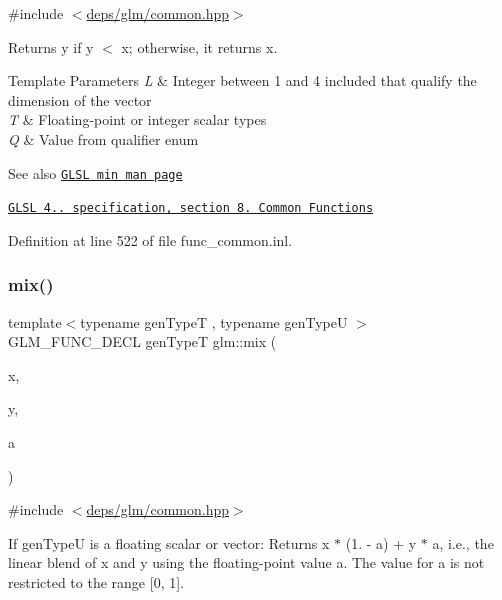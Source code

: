 {\ttfamily \#include $<$\hyperlink{common_8hpp}{deps/glm/common.\+hpp}$>$}

Returns y if y $<$ x; otherwise, it returns x.


\begin{DoxyTemplParams}{Template Parameters}
{\em L} & Integer between 1 and 4 included that qualify the dimension of the vector \\
\hline
{\em T} & Floating-\/point or integer scalar types \\
\hline
{\em Q} & Value from qualifier enum\\
\hline
\end{DoxyTemplParams}
\begin{DoxySeeAlso}{See also}
\href{http://www.opengl.org/sdk/docs/manglsl/xhtml/min.xml}{\tt G\+L\+SL min man page} 

\href{http://www.opengl.org/registry/doc/GLSLangSpec.4.20.8.pdf}{\tt G\+L\+SL 4.. specification, section 8. Common Functions} 
\end{DoxySeeAlso}


Definition at line 522 of file func\+\_\+common.\+inl.

\mbox{\label{group__core__func__common_ga8e93f374aae27d1a88b921860351f8d4}} 
\subsubsection{\texorpdfstring{mix()}{mix()}}
{\footnotesize\ttfamily template$<$typename gen\+TypeT , typename gen\+TypeU $>$ \\
G\+L\+M\+\_\+\+F\+U\+N\+C\+\_\+\+D\+E\+CL gen\+TypeT glm\+::mix (\begin{DoxyParamCaption}\item[{gen\+TypeT}]{x,  }\item[{gen\+TypeT}]{y,  }\item[{gen\+TypeU}]{a }\end{DoxyParamCaption})}



{\ttfamily \#include $<$\hyperlink{common_8hpp}{deps/glm/common.\+hpp}$>$}

If gen\+TypeU is a floating scalar or vector\+: Returns x $\ast$ (1. -\/ a) + y $\ast$ a, i.\+e., the linear blend of x and y using the floating-\/point value a. The value for a is not restricted to the range \mbox{[}0, 1\mbox{]}.

